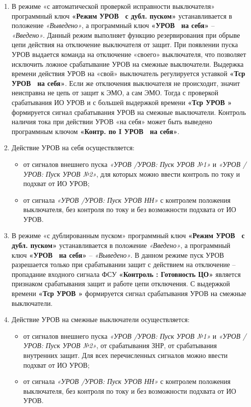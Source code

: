 \begin{enumerate}
\item
В режиме «с автоматической проверкой исправности выключателя» программный ключ \textbf{«Режим УРОВ \Q~с дубл. пуском»} устанавливается в положение \textit{«Выведено»}, а программный ключ \textbf{«УРОВ \Q~на себя»} -- \textit{«Введено»}. Данный режим выполняет функцию резервирования при обрыве цепи действия на отключение выключателя от защит. При появлении пуска УРОВ выдается команда на отключение «своего» выключателя, что позволяет исключить ложное срабатывание УРОВ на смежные выключатели. Выдержка времени действия УРОВ на «свой» выключатель регулируется уставкой \textbf{«Тср УРОВ \Q~на себя»}. Если же отключения выключателя не происходит, значит неисправна не цепь от защит к ЭМО, а сам ЭМО. Тогда с проверкой срабатывания ИО УРОВ и с большей выдержкой времени \textbf{«Тср УРОВ \Q»} формируется сигнал срабатывания УРОВ на смежные выключатели. Контроль наличия тока при действии УРОВ «на себя» может быть выведено программным ключом \textbf{«Контр. по I УРОВ \Q~на себя»}.

\item
Действие УРОВ на себя осуществляется:
\begin{itemize}
    \item от сигналов внешнего пуска \textit{«УРОВ \Q/УРОВ: Пуск УРОВ №1»} и \textit{«УРОВ \Q/УРОВ: Пуск УРОВ №2»}, для которых можно ввести контроль по току и подхват от ИО УРОВ; 
    \item от сигнала \textit{«УРОВ \Q/УРОВ: Пуск УРОВ НН»} с контролем положения выключателя, без контроля по току и без возможности подхвата от ИО УРОВ.
\end{itemize}

\item
В режиме «с дублированным пуском» программный ключ \textbf{«Режим УРОВ \Q~с дубл. пуском»} устанавливается в положение \textit{«Введено»}, а программный ключ \textbf{«УРОВ \Q~на себя»} – \textit{«Выведено»}. В данном режиме пуск УРОВ разрешается только при срабатывании защит с действием на отключение – пропадание входного сигнала ФСУ \textbf{«Контроль \Q : Готовность ЦО»} является признаком срабатывания защит и работе цепи отключения. С выдержкой времени \textbf{«Тср УРОВ \Q»} формируется сигнал срабатывания УРОВ на смежные выключатели.

\item
Действие УРОВ на смежные выключатели осуществляется:
\begin{itemize}
    \item от сигналов внешнего пуска \textit{«УРОВ \Q/УРОВ: Пуск УРОВ №1»} и \textit{«УРОВ \Q/УРОВ: Пуск УРОВ №2»}, от срабатывания ЗНР, от срабатывания внутренних защит. Для всех перечисленных сигналов можно ввести подхват от ИО УРОВ; 
    \item от сигнала \textit{«УРОВ \Q/УРОВ: Пуск УРОВ НН»} с контролем положения выключателя, без контроля по току и без возможности подхвата от ИО УРОВ.
\end{itemize}


\end{enumerate}
